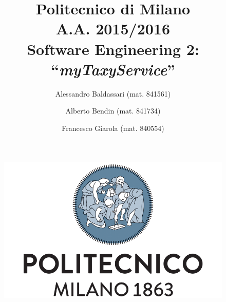 \documentclass[a4paper,11pt]{report} %
\title{Politecnico di Milano\\A.A. 2015/2016\\Software Engineering 2: ``{\em myTaxyService}''}
\author{Alessandro Baldassari (mat. 841561) \and Alberto Bendin (mat. 841734) \and Francesco Giarola (mat. 840554)}
\begin{document}
	
	
	\begin{figure}[t]
		\centering
			\includegraphics[width=1\linewidth]{"Pictures/polimi-logo"}
		\label{fig:polimi-logo}
	\end{figure}
	
	\maketitle
		
	

	\thispagestyle{empty}
	\clearpage\mbox{}\clearpage
	
	
	
	\renewcommand*\thesection{\arabic{section}}
	\renewcommand*\thesubsection{\arabic{section}.\arabic{subsection}}
	\renewcommand*\thesubsubsection{%
		\arabic{section}.\arabic{subsection}.\arabic{subsubsection}%
	}
	\setcounter{secnumdepth}{4}
	\setcounter{tocdepth}{4}
		
	
	\tableofcontents
	\newpage
	
	
	
\end{document}
